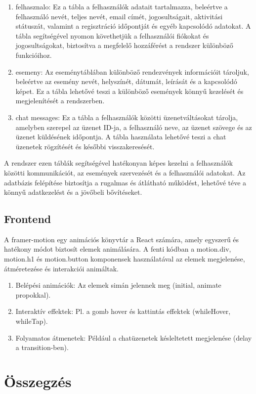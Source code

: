 \documentclass[colorlinks]{thesis-kando}
\theoremstyle{definition}
\theoremstyle{remark}
\begin{document}
\begin{enumerate}
	\item felhasznalo: Ez a tábla a felhasználók adatait tartalmazza, beleértve a felhasználó nevét, teljes nevét, email címét, jogosultságait, aktivitási státuszát, valamint a regisztráció időpontját és egyéb kapcsolódó adatokat. A tábla segítségével nyomon követhetjük a felhasználói fiókokat és jogosultságokat, biztosítva a megfelelő hozzáférést a rendszer különböző funkcióihoz.
	\item esemeny: Az eseménytáblában különböző rendezvények információit tároljuk, beleértve az esemény nevét, helyszínét, dátumát, leírását és a kapcsolódó képet. Ez a tábla lehetővé teszi a különböző események könnyű kezelését és megjelenítését a rendszerben.
	\item chat messages: Ez a tábla a felhasználók közötti üzenetváltásokat tárolja, amelyben szerepel az üzenet ID-ja, a felhasználó neve, az üzenet szövege és az üzenet küldésének időpontja. A tábla használata lehetővé teszi a chat üzenetek rögzítését és későbbi visszakeresését.
\end{enumerate}

\noindent A rendszer ezen táblák segítségével hatékonyan képes kezelni a felhasználók közötti kommunikációt, az események szervezését és a felhasználói adatokat. Az adatbázis felépítése biztosítja a rugalmas és átlátható működést, lehetővé téve a könnyű adatkezelést és a jövőbeli bővítéseket.



\section{Frontend}
A framer-motion egy animációs könyvtár a React számára, amely egyszerű és hatékony módot biztosít elemek animálására. A fenti kódban a motion.div, motion.h1 és motion.button komponensek használatával az elemek megjelenése, átméretezése és interakciói animáltak.
\begin{enumerate}
	Mire alkalmas?
	\item Belépési animációk: Az elemek simán jelennek meg (initial, animate propokkal).
	\item Interaktív effektek: Pl. a gomb hover és kattintás effektek (whileHover, whileTap).
	\item Folyamatos átmenetek: Például a chatüzenetek késleltetett megjelenése (delay a transition-ben).
\end{enumerate}

\chapter*{Összegzés}
\end{document}
